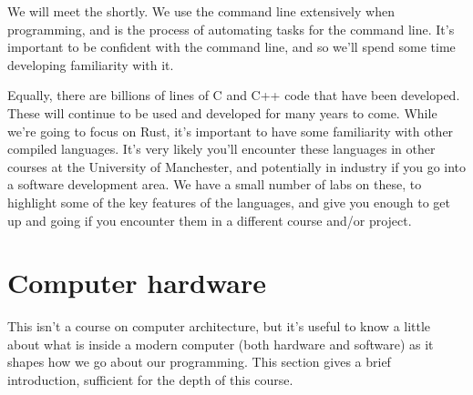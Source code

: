 \documentclass[letterpaper,10pt,british]{sphinxmanual}
\begin{document}
\sphinxAtStartPar
We will meet the {\hyperref[\detokenize{chapters/computer_software/gui_and_cli:cli}]{}} shortly. We use the command line extensively when programming, and  is the process of automating tasks for the command line. It’s important to be confident with the command line, and so we’ll spend some time developing familiarity with it.

\sphinxAtStartPar
Equally, there are billions of lines of C and C++ code that have been developed. These will continue to be used and developed for many years to come. While we’re going to focus on Rust, it’s important to have some familiarity with other compiled languages. It’s very likely you’ll encounter these languages in other courses at the University of Manchester, and potentially in industry if you go into a software development area. We have a small number of labs on these, to highlight some of the key features of the languages, and give you enough to get up and going if you encounter them in a different course and/or project.

\sphinxstepscope


\chapter{Computer hardware}
\label{\detokenize{chapters/computer_hardware:computer-hardware}}\label{\detokenize{chapters/computer_hardware:id1}}\label{\detokenize{chapters/computer_hardware::doc}}
\sphinxAtStartPar
This isn’t a course on computer architecture, but it’s useful to know a little about what is inside a modern computer (both hardware and software) as it shapes how we go about our programming. This section gives a brief introduction, sufficient for the depth of this course.
\end{document}
